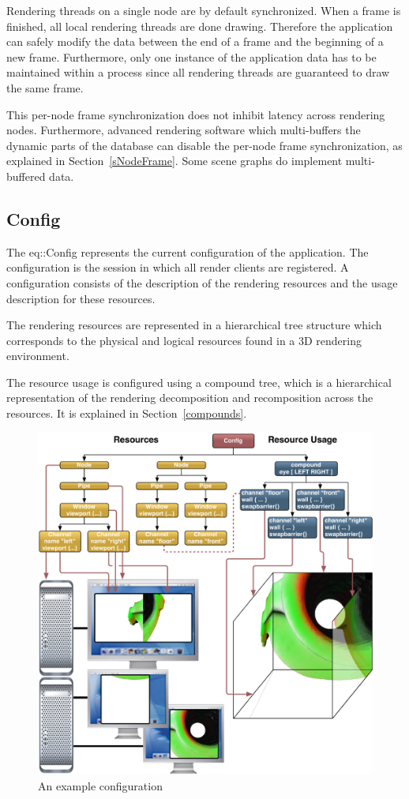 \documentclass[10pt,a4]{scrartcl}
\newcommand{\sref}[1]{Section~\ref{#1}}
\begin{document}
Rendering threads on a single node are by default synchronized. When a
frame is finished, all local rendering threads are done
drawing. Therefore the application can safely modify the data between
the end of a frame and the beginning of a new frame. Furthermore, only
one instance of the application data has to be maintained within a
process since all rendering threads are guaranteed to draw the same frame.

This per-node frame synchronization does not inhibit latency across
rendering nodes. Furthermore, advanced rendering software which
multi-buffers the dynamic parts of the database can disable the per-node
frame synchronization, as explained in \sref{sNodeFrame}. Some scene
graphs do implement multi-buffered data.



\subsection{\label{sConfig}Config}

The \textsf{eq::Config} represents the current configuration of the
application. The configuration is the session in which all render
clients are registered. A configuration consists of the description of
the rendering resources and the usage description for these resources.

The rendering resources are represented in a hierarchical tree structure
which corresponds to the physical and logical resources found in a 3D
rendering environment. 

The resource usage is configured using a compound tree, which is a
hierarchical representation of the rendering decomposition and
recomposition across the resources. It is explained in \sref{compounds}.

\begin{figure}[ht!]\center
  \includegraphics[width=\textwidth]{images/cave.pdf}
  {\caption{\small\label{fConfig}An example configuration}}
\end{figure}
\end{document}
